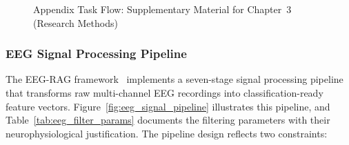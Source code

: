 \begin{figure}[!htbp]
{%
}%
\caption[Appendix Task Flow]{Appendix Task Flow: Supplementary Material for Chapter~3 (Research Methods)}
\label{fig:appendix_ch3_taskflow}
\end{figure}



\subsubsection{EEG Signal Processing Pipeline}
\label{sec:eeg_signal_pipeline}

The EEG-RAG framework~\cite{asthana2025eegmaster} implements a seven-stage signal processing pipeline that transforms raw multi-channel EEG recordings into classification-ready feature vectors. Figure~\ref{fig:eeg_signal_pipeline} illustrates this pipeline, and Table~\ref{tab:eeg_filter_params} documents the filtering parameters with their neurophysiological justification. The pipeline design reflects two constraints:

